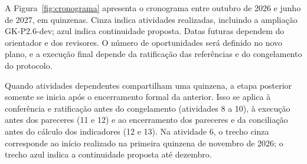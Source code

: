 A Figura~\ref{fig:cronograma} apresenta o cronograma entre outubro de 2026 e junho de 2027, em quinzenas. Cinza indica atividades realizadas, incluindo a ampliação GK-P2.6-dev; azul indica continuidade proposta. Datas futuras dependem do orientador e dos revisores. O número de oportunidades será definido no novo plano, e a execução final depende da ratificação das referências e do congelamento do protocolo.

Quando atividades dependentes compartilham uma quinzena, a etapa posterior somente se inicia após o encerramento formal da anterior. Isso se aplica à conferência e ratificação antes do congelamento (atividades 8 a 10), à execução antes dos pareceres (11 e 12) e ao encerramento dos pareceres e da conciliação antes do cálculo dos indicadores (12 e 13). Na atividade 6, o trecho cinza corresponde ao início realizado na primeira quinzena de novembro de 2026; o trecho azul indica a continuidade proposta até dezembro.

